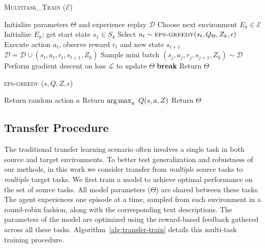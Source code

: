  \begin{algorithm}[t]
\caption{\textsc{Multitask\_Train ($\mathcal{E}$)}}
\label{alg:transfer-train}
\begin{algorithmic}[1]
\State Initialize parameters $\Theta$ and experience replay $\mathcal{D}$
  
	\State Choose next environment $E_k \in \mathcal{E}$
	\State Initialize $E_k$; get start state $s_1 \in S_k$	
	   
    	\State Select $a_t \sim \textsc{eps-greedy}(s_t, Q_\Theta, Z_k, \epsilon)$		
		\State Execute action $a_t$, observe reward $r_t$ and new state $s_{t+1}$
		\State $\mathcal{D} = \mathcal{D} \cup (s_t, a_t, r_t, s_{t+1}, Z_k)$
		\State Sample mini batch $(s_j, a_j, r_j, s_{j+1}, Z_k) \sim \mathcal{D}$
		\State Perform gradient descent on loss $\mathcal{L}$ to update $\Theta$
			\textbf{break}
		\EndIf
	\EndFor
\EndFor
\State Return $\Theta$
\end{algorithmic}
\end{algorithm}

\begin{algorithm}[t]
\caption{\textsc{eps-greedy} ($s,Q,Z,\epsilon$)}
\label{alg:transfer-eps-greedy}
\begin{algorithmic}[1]
			\State Return random action $a$
		\Else		        	
			\State Return  $\operatorname*{arg\,max}_a~Q(s, a, Z)$  
		\EndIf
\State Return $\Theta$
\end{algorithmic}
\end{algorithm}

\subsection{Transfer Procedure}
The traditional transfer learning scenario often involves a single task in both source and target environments. To better test generalization and robustness of our methods, in this work we consider transfer from \emph{multiple} source tasks to \emph{multiple} target tasks.
We first train a model to achieve optimal performance on the set of source tasks. All model parameters ($\Theta$) are shared between these tasks. The agent experiences one episode at a time, sampled from each environment in a round-robin fashion, along with the corresponding text descriptions. The parameters of the model are optimized using the reward-based feedback gathered across all these tasks. Algorithm~\ref{alg:transfer-train} details this multi-task training procedure.

